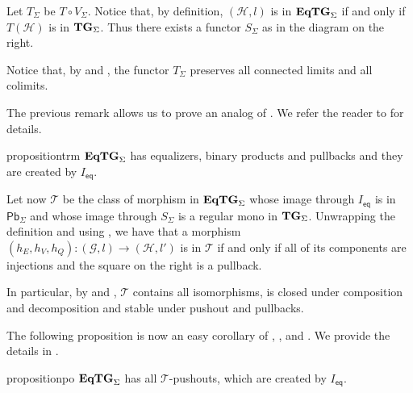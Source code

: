 \documentclass[a4paper,UKenglish,cleveref,pdftex,thm-restate,numberwithinsect]{lipics-v2021}
\newcommand{\pbc}{\mathsf{Pb}}
\newcommand{\eq}{\mathsf{eq}}
\newcommand{\catname}[1]{\textbf{\textup{#1}}}
\newcommand{\hyp}{\catname{Hyp}}
\newcommand{\EqHyp}{\catname{EqHyp}} %
\newcommand{\EqTG}{\catname{EqTG}}
\newcommand{\tg}[0]{\catname{TG}_{\Sigma}}
\begin{document}
\noindent 
\parbox{9.5cm}{\begin{remark}\label{rem:obv}
Let $T_\Sigma$ be  $T\circ V_\Sigma$.   Notice that, by definition, $(\mathcal{H}, l)$ is in $\EqTG_{\Sigma}$ if and only if $T(\mathcal{H})$ is in $\tg$. Thus there exists a functor $S_\Sigma$ as in the diagram on the right.
\end{remark}}\hfill \parbox{4cm}{\xymatrix@R=15pt{\EqTG_{\Sigma} \ar[r]_{I_\eq}  \ar[d]_{S_\Sigma}& \EqHyp_\Sigma \ar[d]^{T_\Sigma} \\ \tg \ar[r]^{I_\Sigma}& \hyp_{\Sigma}}}

\begin{remark}\label{rem:t}
	Notice that, by  and , the functor $T_\Sigma$ preserves all connected limits and all colimits.
\end{remark}

 The previous remark allows us to prove an analog of . We refer the reader to  for details.
 
 \begin{restatable}{proposition}{trm}\label{prop:term}
$\EqTG_{\Sigma}$ has equalizers, binary products and pullbacks and they are created by $I_\eq$.
 \end{restatable}
 
\noindent
\parbox{11cm}{\hspace{15pt}Let now $\mathcal{T}$ be the class of morphism in $\EqTG_{\Sigma}$ whose image through $I_\eq$ is in $\pbc_\Sigma$ and whose image through $S_\Sigma$ is a regular mono in $\tg$.  Unwrapping the definition and using , we have that a morphism $(h_E, h_V, h_Q)\colon (\mathcal{G},l)\to (\mathcal{H}, l')$ is in $\mathcal{T}$ if and only if all of its components are injections and the square on the right is a pullback.} \hfill \parbox{2cm}{ }

\smallskip 
In particular, by  and , $\mathcal{T}$ contains all isomorphisms, is closed under composition and decomposition and stable under pushout and pullbacks.

The following proposition is now an easy corollary of , , and . We provide the details in .


\begin{restatable}{proposition}{po}\label{prop:po}
$\EqTG_{\Sigma}$ has all $\mathcal{T}$-pushouts, which are created by $I_{\eq}$.
\end{restatable}
\end{document}
